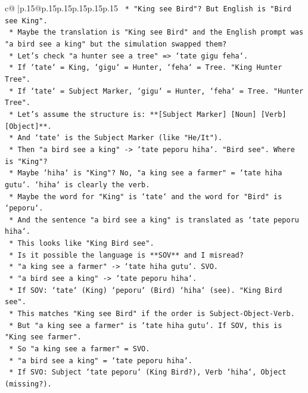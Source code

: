 \documentclass{article}
\begin{document}
{\begin{supertabular}{c@{$\;$}|p{.15\linewidth}@{}p{.15\linewidth}p{.15\linewidth}p{.15\linewidth}p{.15\linewidth}p{.15\linewidth}}
{{{\texttt{    *   "King see Bird"? But English is "Bird see King".} \\
\texttt{    *   Maybe the translation is "King see Bird" and the English prompt was "a bird see a king" but the simulation swapped them?} \\
\texttt{    *   Let's check "a hunter see a tree" => `tate gigu feha`.} \\
\texttt{    *   If `tate` = King, `gigu` = Hunter, `feha` = Tree. "King Hunter Tree".} \\
\texttt{    *   If `tate` = Subject Marker, `gigu` = Hunter, `feha` = Tree. "Hunter Tree".} \\
\texttt{    *   Let's assume the structure is: **{[}Subject Marker{]} {[}Noun{]} {[}Verb{]} {[}Object{]}**.} \\
\texttt{    *   And `tate` is the Subject Marker (like "He/It").} \\
\texttt{    *   Then "a bird see a king" {-}> `tate peporu hiha`. "Bird see". Where is "King"?} \\
\texttt{    *   Maybe `hiha` is "King"? No, "a king see a farmer" = `tate hiha gutu`. `hiha` is clearly the verb.} \\
\texttt{    *   Maybe the word for "King" is `tate` and the word for "Bird" is `peporu`.} \\
\texttt{    *   And the sentence "a bird see a king" is translated as `tate peporu hiha`.} \\
\texttt{    *   This looks like "King Bird see".} \\
\texttt{    *   Is it possible the language is **SOV** and I misread?} \\
\texttt{    *   "a king see a farmer" {-}> `tate hiha gutu`. SVO.} \\
\texttt{    *   "a bird see a king" {-}> `tate peporu hiha`.} \\
\texttt{    *   If SOV: `tate` (King) `peporu` (Bird) `hiha` (see). "King Bird see".} \\
\texttt{    *   This matches "King see Bird" if the order is Subject{-}Object{-}Verb.} \\
\texttt{    *   But "a king see a farmer" is `tate hiha gutu`. If SOV, this is "King see farmer".} \\
\texttt{    *   So "a king see a farmer" = SVO.} \\
\texttt{    *   "a bird see a king" = `tate peporu hiha`.} \\
\texttt{    *   If SVO: Subject `tate peporu` (King Bird?), Verb `hiha`, Object (missing?).} \\
}}}
\end{supertabular}}
\end{document}
